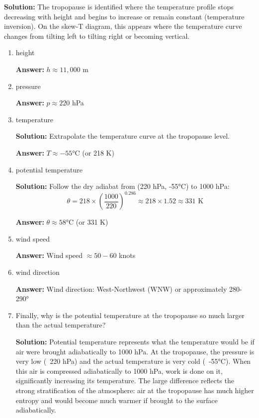 \documentclass[letterpaper, 11pt]{article}
\newcommand{\1}{\mathds{1}}	%
\theoremstyle{definition}
\begin{document}
\textbf{Solution:} The tropopause is identified where the temperature profile stops decreasing with height and begins to increase or remain constant (temperature inversion). On the skew-T diagram, this appears where the temperature curve changes from tilting left to tilting right or becoming vertical.

\begin{enumerate}[label=(\alph*)]
    \item height
    
    \textbf{Answer:} $h \approx 11,000$ m
    
    \item pressure
    
    \textbf{Answer:} $p \approx 220$ hPa
    
    \item temperature
    
    \textbf{Solution:} Extrapolate the temperature curve at the tropopause level.
    
    \textbf{Answer:} $T \approx -55°\text{C}$ (or 218 K)
    
    \item potential temperature
    
    \textbf{Solution:} Follow the dry adiabat from (220 hPa, -55°C) to 1000 hPa:
    \begin{equation}
    \theta = 218 \times \left(\frac{1000}{220}\right)^{0.286} \approx 218 \times 1.52 \approx 331 \text{ K}
    \end{equation}
    
    \textbf{Answer:} $\theta \approx 58°\text{C}$ (or 331 K)
    
    \item wind speed
    
    \textbf{Answer:} Wind speed $\approx 50-60$ knots
    
    \item wind direction
    
    \textbf{Answer:} Wind direction: West-Northwest (WNW) or approximately 280-290°
    
    \item Finally, why is the potential temperature at the tropopause so much larger than the actual temperature?
    
    \textbf{Solution:} Potential temperature represents what the temperature would be if air were brought adiabatically to 1000 hPa. At the tropopause, the pressure is very low (~220 hPa) and the actual temperature is very cold (~-55°C). When this air is compressed adiabatically to 1000 hPa, work is done on it, significantly increasing its temperature. The large difference reflects the strong stratification of the atmosphere: air at the tropopause has much higher entropy and would become much warmer if brought to the surface adiabatically.
\end{enumerate}
\end{document}
